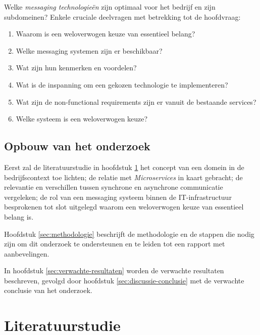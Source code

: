 Welke \emph{messaging technologieën} zijn optimaal voor het bedrijf en zijn subdomeinen?
Enkele cruciale deelvragen met betrekking tot de hoofdvraag:

\begin{enumerate}
  \item Waarom is een weloverwogen keuze van essentieel belang?
  \item Welke messaging systemen zijn er beschikbaar?
  \item Wat zijn hun kenmerken en voordelen?
  \item Wat is de inspanning om een gekozen technologie te implementeren?
  \item Wat zijn de non-functional requirements zijn er vanuit de bestaande services?
  \item Welke systeem is een weloverwogen keuze?
\end{enumerate}

\subsection{Opbouw van het onderzoek}
Eerst zal de literatuurstudie in hoofdstuk \ref{sec:literatuurstudie} het concept 
van een domein in de bedrijfscontext toe lichten;
de relatie met \emph{Microservices} in kaart gebracht; 
de relevantie en verschillen tussen synchrone en asynchrone communicatie vergeleken; 
de rol van een messaging systeem binnen de IT-infrastructuur besprokenen tot slot 
uitgelegd waarom een weloverwogen keuze van essentieel belang is.

Hoofdstuk \ref{sec:methodologie} beschrijft de methodologie en de stappen die nodig zijn om dit onderzoek te ondersteunen
en te leiden tot een rapport met aanbevelingen. 

In hoofdstuk \ref{sec:verwachte-resultaten} worden de verwachte resultaten beschreven, gevolgd door 
hoofdstuk \ref{sec:discussie-conclusie} met de verwachte conclusie van het onderzoek.

\bigskip



\section{Literatuurstudie}%
\label{sec:literatuurstudie}


